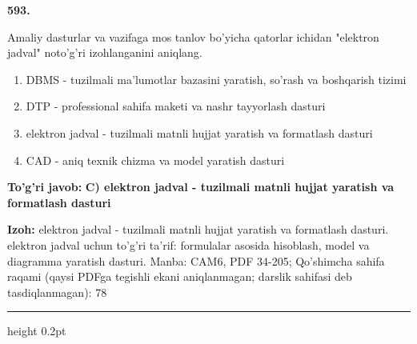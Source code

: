 \documentclass[10pt,a4paper]{article}
\begin{document}
{\bfseries\sffamily\color{ink} 593.}
\par
Amaliy dasturlar va vazifaga mos tanlov bo'yicha qatorlar ichidan "elektron jadval" noto'g'ri izohlanganini aniqlang.
\begin{enumerate}[label=\Alph*),leftmargin=9mm]
\item DBMS - tuzilmali ma'lumotlar bazasini yaratish, so'rash va boshqarish tizimi
\item DTP - professional sahifa maketi va nashr tayyorlash dasturi
\item elektron jadval - tuzilmali matnli hujjat yaratish va formatlash dasturi
\item CAD - aniq texnik chizma va model yaratish dasturi
\end{enumerate}
\begin{tcolorbox}[enhanced,breakable,colback=teal!4,colframe=teal!60!black,boxrule=0.45pt,arc=1.2mm,left=2.7mm,right=2.7mm,top=1.8mm,bottom=1.8mm,before skip=2mm,after skip=2mm]
{\bfseries\sffamily\color{teal}To'g'ri javob:} \textbf{C) elektron jadval - tuzilmali matnli hujjat yaratish va formatlash dasturi}
\par\smallskip
{\bfseries Izoh:} elektron jadval - tuzilmali matnli hujjat yaratish va formatlash dasturi. elektron jadval uchun to'g'ri ta'rif: formulalar asosida hisoblash, model va diagramma yaratish dasturi. Manba: CAM6, PDF 34-205; Qo'shimcha sahifa raqami (qaysi PDFga tegishli ekani aniqlanmagan; darslik sahifasi deb tasdiqlanmagan): 78
\end{tcolorbox}
\vspace{2mm}\hrule height 0.2pt\vspace{3mm}
\end{document}
